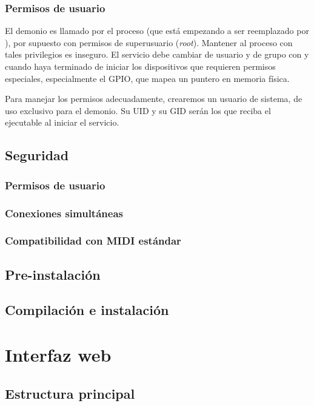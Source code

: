 \subsubsection{Permisos de usuario}

El demonio es llamado por el proceso  (que está empezando a ser reemplazado por ), por supuesto con permisos de superusuario (\textit{root}). Mantener al proceso con tales privilegios es inseguro. El servicio debe cambiar de usuario y de grupo con  y  cuando haya terminado de iniciar los dispositivos que requieren permisos especiales, especialmente el \acrshort{GPIO}, que mapea un puntero en memoria física.

Para manejar los permisos adecuadamente, crearemos un usuario de sistema, de uso exclusivo para el demonio. Su \acrshort{UID} y su \acrshort{GID} serán los que reciba el ejecutable al iniciar el servicio.

\subsection{Seguridad}
\subsubsection{Permisos de usuario}
\subsubsection{Conexiones simultáneas}
\subsubsection{Compatibilidad con MIDI estándar}

\subsection{Pre-instalación}

\subsection{Compilación e instalación}





\section{Interfaz web}

\subsection{Estructura principal}
